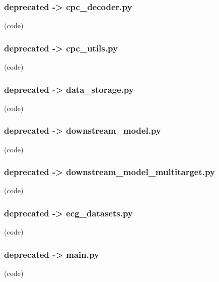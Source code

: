 \begin{myparindent}{0pt}

\noindent\subsubsection[cpc\_decoder.py]{deprecated -> cpc\_decoder.py} (code)

\noindent\subsubsection[cpc\_utils.py]{deprecated -> cpc\_utils.py} (code)

\noindent\subsubsection[data\_storage.py]{deprecated -> data\_storage.py} (code)

\noindent\subsubsection[downstream\_model.py]{deprecated -> downstream\_model.py} (code)

\noindent\subsubsection[downstream\_model\_multitarget.py]{deprecated -> downstream\_model\_multitarget.py} (code)

\noindent\subsubsection[ecg\_datasets.py]{deprecated -> ecg\_datasets.py} (code)

\noindent\subsubsection[main.py]{deprecated -> main.py} (code)


\end{myparindent}
